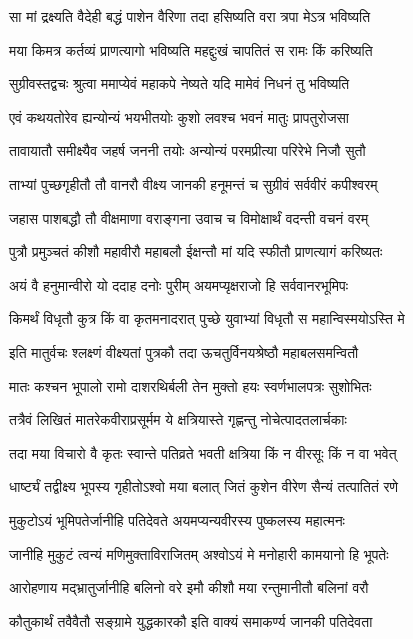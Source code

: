 \twolineshloka
{सा मां द्रक्ष्यति वैदेही बद्धं पाशेन वैरिणा}
{तदा हसिष्यति वरा त्रपा मेऽत्र भविष्यति}%

\twolineshloka
{मया किमत्र कर्तव्यं प्राणत्यागो भविष्यति}
{महद्दुःखं चापतितं स रामः किं करिष्यति}%

\twolineshloka
{सुग्रीवस्तद्वचः श्रुत्वा ममाप्येवं महाकपे}
{नेष्यते यदि मामेवं निधनं तु भविष्यति}%

\twolineshloka
{एवं कथयतोरेव ह्यन्योन्यं भयभीतयोः}
{कुशो लवश्च भवनं मातुः प्रापतुरोजसा}%

\twolineshloka
{तावायातौ समीक्ष्यैव जहर्ष जननी तयोः}
{अन्योन्यं परमप्रीत्या परिरेभे निजौ सुतौ}%

\twolineshloka
{ताभ्यां पुच्छगृहीतौ तौ वानरौ वीक्ष्य जानकी}
{हनूमन्तं च सुग्रीवं सर्ववीरं कपीश्वरम्}%

\twolineshloka
{जहास पाशबद्धौ तौ वीक्षमाणा वराङ्गना}
{उवाच च विमोक्षार्थं वदन्ती वचनं वरम्}%

\twolineshloka
{पुत्रौ प्रमुञ्चतं कीशौ महावीरौ महाबलौ}
{ईक्षन्तौ मां यदि स्फीतौ प्राणत्यागं करिष्यतः}%

\twolineshloka
{अयं वै हनुमान्वीरो यो ददाह दनोः पुरीम्}
{अयमप्यृक्षराजो हि सर्ववानरभूमिपः}%

\twolineshloka
{किमर्थं विधृतौ कुत्र किं वा कृतमनादरात्}
{पुच्छे युवाभ्यां विधृतौ स महान्विस्मयोऽस्ति मे}%

\twolineshloka
{इति मातुर्वचः श्लक्ष्णं वीक्ष्यतां पुत्रकौ तदा}
{ऊचतुर्विनयश्रेष्ठौ महाबलसमन्वितौ}%

\twolineshloka
{मातः कश्चन भूपालो रामो दाशरथिर्बली}
{तेन मुक्तो हयः स्वर्णभालपत्रः सुशोभितः}%

\twolineshloka
{तत्रैवं लिखितं मातरेकवीराप्रसूर्मम}
{ये क्षत्रियास्ते गृह्णन्तु नोचेत्पादतलार्चकाः}%

\twolineshloka
{तदा मया विचारो वै कृतः स्वान्ते पतिव्रते}
{भवती क्षत्रिया किं न वीरसूः किं न वा भवेत्}%

\twolineshloka
{धार्ष्ट्यं तद्वीक्ष्य भूपस्य गृहीतोऽश्वो मया बलात्}
{जितं कुशेन वीरेण सैन्यं तत्पातितं रणे}%

\twolineshloka
{मुकुटोऽयं भूमिपतेर्जानीहि पतिदेवते}
{अयमप्यन्यवीरस्य पुष्कलस्य महात्मनः}%

\twolineshloka
{जानीहि मुकुटं त्वन्यं मणिमुक्ताविराजितम्}
{अश्वोऽयं मे मनोहारी कामयानो हि भूपतेः}%

\twolineshloka
{आरोहणाय मद्भ्रातुर्जानीहि बलिनो वरे}
{इमौ कीशौ मया रन्तुमानीतौ बलिनां वरौ}%

\twolineshloka
{कौतुकार्थं तवैवैतौ सङ्ग्रामे युद्धकारकौ}
{इति वाक्यं समाकर्ण्य जानकी पतिदेवता}%

